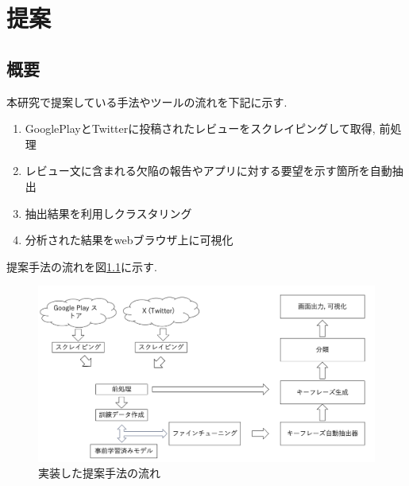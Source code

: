 \chapter{提案}
\label{chap:teian}


\section{概要}
本研究で提案している手法やツールの流れを下記に示す. 

\begin{enumerate}
  \item GooglePlayとTwitterに投稿されたレビューをスクレイピングして取得, 前処理
  \item レビュー文に含まれる欠陥の報告やアプリに対する要望を示す箇所を自動抽出
  \item 抽出結果を利用しクラスタリング
  \item 分析された結果をwebブラウザ上に可視化
\end{enumerate}

提案手法の流れを図\ref{fig:nagare}に示す. 

\begin{figure}[hbtp]
  \centering
  \includegraphics[width=\linewidth]
       {contents/images/zisso_nagare.png}
  \caption{実装した提案手法の流れ\label{fig:nagare}}
\end{figure}


